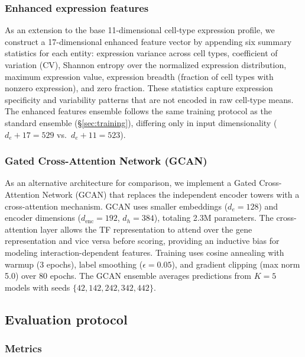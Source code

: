 \documentclass[10pt,twocolumn]{article}
\begin{document}
\subsubsection{Enhanced expression features}
\label{sec:enhanced_features}

As an extension to the base 11-dimensional cell-type expression profile, we construct a 17-dimensional enhanced feature vector by appending six summary statistics for each entity: expression variance across cell types, coefficient of variation (CV), Shannon entropy over the normalized expression distribution, maximum expression value, expression breadth (fraction of cell types with nonzero expression), and zero fraction.
These statistics capture expression specificity and variability patterns that are not encoded in raw cell-type means.
The enhanced features ensemble follows the same training protocol as the standard ensemble (\S\ref{sec:training}), differing only in input dimensionality ($d_e + 17 = 529$ vs.\ $d_e + 11 = 523$).

\subsubsection{Gated Cross-Attention Network (GCAN)}
\label{sec:gcan}

As an alternative architecture for comparison, we implement a Gated Cross-Attention Network (GCAN) that replaces the independent encoder towers with a cross-attention mechanism.
GCAN uses smaller embeddings ($d_e = 128$) and encoder dimensions ($d_{\text{enc}} = 192$, $d_h = 384$), totaling 2.3M parameters.
The cross-attention layer allows the TF representation to attend over the gene representation and vice versa before scoring, providing an inductive bias for modeling interaction-dependent features.
Training uses cosine annealing with warmup (3 epochs), label smoothing ($\epsilon = 0.05$), and gradient clipping (max norm 5.0) over 80 epochs.
The GCAN ensemble averages predictions from $K = 5$ models with seeds $\{42, 142, 242, 342, 442\}$.

\subsection{Evaluation protocol}
\label{sec:evaluation}

\subsubsection{Metrics}
\end{document}

